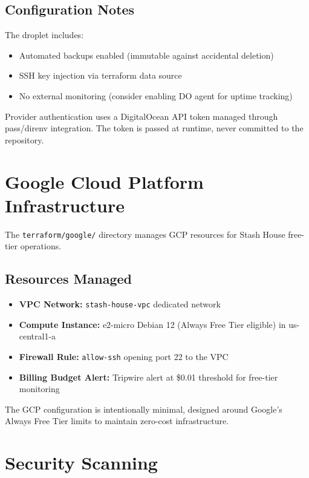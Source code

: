\subsection{Configuration Notes}

The droplet includes:
\begin{itemize}
    \item Automated backups enabled (immutable against accidental deletion)
    \item SSH key injection via terraform data source
    \item No external monitoring (consider enabling DO agent for uptime tracking)
\end{itemize}

Provider authentication uses a DigitalOcean API token managed through pass/direnv integration. The token is passed at runtime, never committed to the repository.

\section{Google Cloud Platform Infrastructure}

The \texttt{terraform/google/} directory manages GCP resources for Stash House free-tier operations.

\subsection{Resources Managed}

\begin{itemize}
    \item \textbf{VPC Network:} \texttt{stash-house-vpc} dedicated network
    \item \textbf{Compute Instance:} e2-micro Debian 12 (Always Free Tier eligible) in us-central1-a
    \item \textbf{Firewall Rule:} \texttt{allow-ssh} opening port 22 to the VPC
    \item \textbf{Billing Budget Alert:} Tripwire alert at \$0.01 threshold for free-tier monitoring
\end{itemize}

The GCP configuration is intentionally minimal, designed around Google's Always Free Tier limits to maintain zero-cost infrastructure.

\section{Security Scanning}

